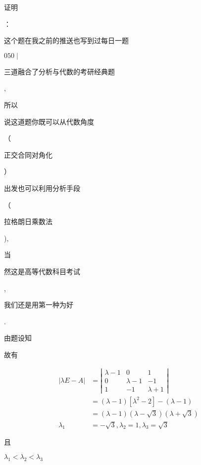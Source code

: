 \documentclass[10pt]{article}
\begin{document}
\begin{CJK}{UTF8}{mj}证明\end{CJK}：\begin{CJK}{UTF8}{mj}这个题在我之前的推送也写到过每日一题\end{CJK} $050 \mid$ \begin{CJK}{UTF8}{mj}三道融合了分析与代数的考研经典题\end{CJK}, \begin{CJK}{UTF8}{mj}所以\end{CJK} \begin{CJK}{UTF8}{mj}说这道题你既可以从代数角度\end{CJK}（\begin{CJK}{UTF8}{mj}正交合同对角化\end{CJK}）\begin{CJK}{UTF8}{mj}出发也可以利用分析手段\end{CJK}（\begin{CJK}{UTF8}{mj}拉格朗日乘数法\end{CJK}), \begin{CJK}{UTF8}{mj}当\end{CJK} \begin{CJK}{UTF8}{mj}然这是高等代数科目考试\end{CJK}, \begin{CJK}{UTF8}{mj}我们还是用第一种为好\end{CJK}.

\begin{CJK}{UTF8}{mj}由题设知\end{CJK}

\begin{CJK}{UTF8}{mj}故有\end{CJK}
$$
\begin{aligned}
|\lambda E-A| &=\left|\begin{array}{ccc}
\lambda-1 & 0 & 1 \\
0 & \lambda-1 & -1 \\
1 & -1 & \lambda+1
\end{array}\right| \\
&=(\lambda-1)\left[\lambda^{2}-2\right]-(\lambda-1) \\
&=(\lambda-1)(\lambda-\sqrt{3})(\lambda+\sqrt{3}) \\
\lambda_{1} &=-\sqrt{3}, \lambda_{2}=1, \lambda_{3}=\sqrt{3}
\end{aligned}
$$
\begin{CJK}{UTF8}{mj}且\end{CJK} $\lambda_{1}<\lambda_{2}<\lambda_{3}$
\end{document}

